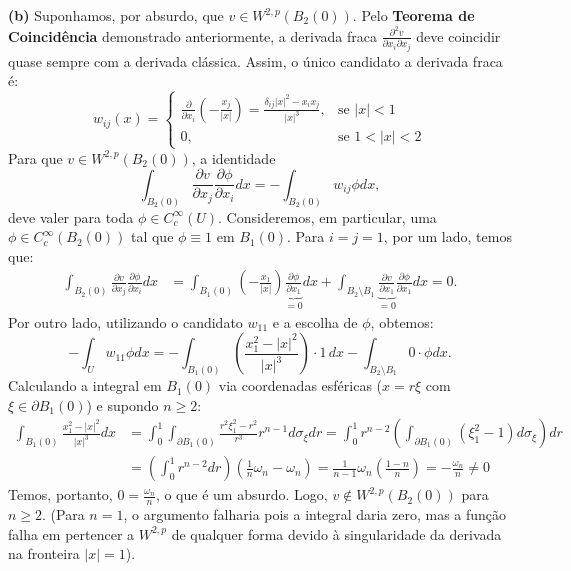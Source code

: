\documentclass[cs_edp_2026.1.tex]{subfiles} %
\begin{document}
{	\textbf{(b)} Suponhamos, por absurdo, que $v \in W^{2,p}(B_2(0))$. Pelo \textbf{Teorema de Coincidência} demonstrado anteriormente, a derivada fraca $\tfrac{\partial^2 v}{\partial x_i \partial x_j}$ deve coincidir quase sempre com a derivada clássica. Assim, o único candidato a derivada fraca é:
	$$w_{ij}(x) = \begin{cases} \frac{\partial}{\partial x_i} \left( -\frac{x_j}{|x|} \right) = \frac{\delta_{ij}|x|^2 - x_i x_j}{|x|^3}, & \text{se } |x| < 1 \\ 0, & \text{se } 1 < |x| < 2 \end{cases}$$
	Para que $v \in W^{2,p}(B_2(0))$, a identidade 
	$$\int_{B_2(0)} \frac{\partial v}{\partial x_j} \frac{\partial \phi}{\partial x_i} dx = - \int_{B_2(0)} w_{ij} \phi dx,$$ 
	deve valer para toda $\phi \in C_c^\infty(U)$. Consideremos, em particular, uma $\phi \in C_c^\infty(B_2(0))$ tal que $\phi \equiv 1$ em $B_1(0)$. Para $i=j=1$, por um lado, temos que:
	\begin{align*}
		\int_{B_2(0)} \frac{\partial v}{\partial x_j} \frac{\partial \phi}{\partial x_i} dx &= \int_{B_1(0)} \left( -\frac{x_1}{|x|} \right) \underbrace{\frac{\partial \phi}{\partial x_1}}_{=0} dx + \int_{B_2 \setminus B_1} \underbrace{\frac{\partial v}{\partial x_1}}_{=0} \frac{\partial \phi}{\partial x_1} dx = 0.
	\end{align*}
	Por outro lado, utilizando o candidato $w_{11}$ e a escolha de $\phi$, obtemos:
	$$- \int_U w_{11} \phi dx = - \int_{B_1(0)} \left(\frac{x_1^2 - |x|^2}{|x|^3}\right) \cdot 1 \, dx - \int_{B_2 \setminus B_1} 0 \cdot \phi dx.$$
	Calculando a integral em $B_1(0)$ via coordenadas esféricas ($x = r\xi$ com $\xi \in \partial B_1(0)$) e supondo $n \ge 2$:
	\begin{align*}
		\int_{B_1(0)} \frac{x_1^2 - |x|^2}{|x|^3} dx &= \int_0^1 \int_{\partial B_1(0)} \frac{r^2 \xi_1^2 - r^2}{r^3} r^{n-1} d\sigma_\xi dr 
		= \int_0^1 r^{n-2} \left( \int_{\partial B_1(0)} (\xi_1^2 - 1) d\sigma_\xi \right) dr \\
		&= \left( \int_0^1 r^{n-2} dr \right) \left( \frac{1}{n}\omega_n - \omega_n \right) = \frac{1}{n-1} \omega_n \left( \frac{1-n}{n} \right) = -\frac{\omega_n}{n} \neq 0
	\end{align*}
	Temos, portanto, $0 = \frac{\omega_n}{n}$, o que é um absurdo. Logo, $\boxed{v \notin W^{2,p}(B_2(0))}$ para $n \ge 2$. (Para $n=1$, o argumento falharia pois a integral daria zero, mas a função falha em pertencer a $W^{2,p}$ de qualquer forma devido à singularidade da derivada na fronteira $|x|=1$).
}
\end{document}
